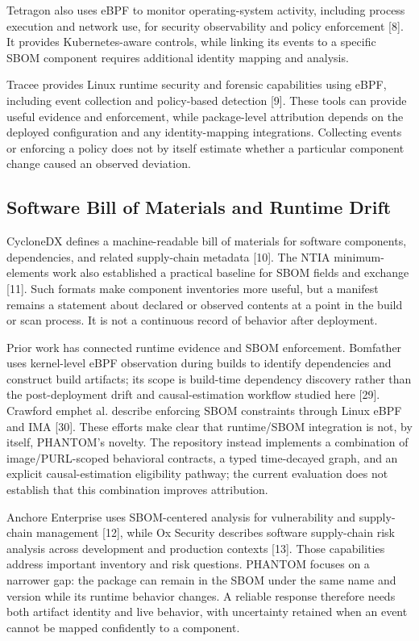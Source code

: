 \documentclass[conference]{IEEEtran}
\begin{document}
Tetragon also uses eBPF to monitor operating-system activity, including process execution and network use, for security observability and policy enforcement [8]. It provides Kubernetes-aware controls, while linking its events to a specific SBOM component requires additional identity mapping and analysis.

Tracee provides Linux runtime security and forensic capabilities using eBPF, including event collection and policy-based detection [9]. These tools can provide useful evidence and enforcement, while package-level attribution depends on the deployed configuration and any identity-mapping integrations. Collecting events or enforcing a policy does not by itself estimate whether a particular component change caused an observed deviation.

\subsection{Software Bill of Materials and Runtime Drift}
CycloneDX defines a machine-readable bill of materials for software components, dependencies, and related supply-chain metadata [10]. The NTIA minimum-elements work also established a practical baseline for SBOM fields and exchange [11]. Such formats make component inventories more useful, but a manifest remains a statement about declared or observed contents at a point in the build or scan process. It is not a continuous record of behavior after deployment.

Prior work has connected runtime evidence and SBOM enforcement. Bomfather uses kernel-level eBPF observation during builds to identify dependencies and construct build artifacts; its scope is build-time dependency discovery rather than the post-deployment drift and causal-estimation workflow studied here [29]. Crawford emph{et al.} describe enforcing SBOM constraints through Linux eBPF and IMA [30]. These efforts make clear that runtime/SBOM integration is not, by itself, PHANTOM's novelty. The repository instead implements a combination of image/PURL-scoped behavioral contracts, a typed time-decayed graph, and an explicit causal-estimation eligibility pathway; the current evaluation does not establish that this combination improves attribution.

Anchore Enterprise uses SBOM-centered analysis for vulnerability and supply-chain management [12], while Ox Security describes software supply-chain risk analysis across development and production contexts [13]. Those capabilities address important inventory and risk questions. PHANTOM focuses on a narrower gap: the package can remain in the SBOM under the same name and version while its runtime behavior changes. A reliable response therefore needs both artifact identity and live behavior, with uncertainty retained when an event cannot be mapped confidently to a component.
\end{document}
